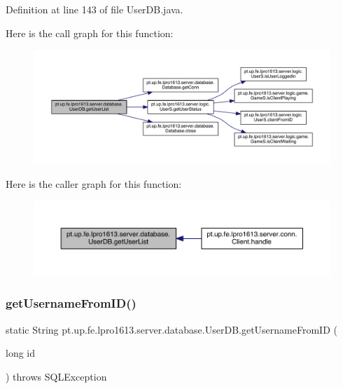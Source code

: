 Definition at line 143 of file User\+D\+B.\+java.

Here is the call graph for this function\+:
\nopagebreak
\begin{figure}[H]
\begin{center}
\leavevmode
\includegraphics[width=350pt]{classpt_1_1up_1_1fe_1_1lpro1613_1_1server_1_1database_1_1_user_d_b_a954a448685644afc277007bdf36bb507_cgraph}
\end{center}
\end{figure}
Here is the caller graph for this function\+:
\nopagebreak
\begin{figure}[H]
\begin{center}
\leavevmode
\includegraphics[width=350pt]{classpt_1_1up_1_1fe_1_1lpro1613_1_1server_1_1database_1_1_user_d_b_a954a448685644afc277007bdf36bb507_icgraph}
\end{center}
\end{figure}
\hypertarget{classpt_1_1up_1_1fe_1_1lpro1613_1_1server_1_1database_1_1_user_d_b_ab5c986eb5c2ba36eef3defee599c6903}{}\label{classpt_1_1up_1_1fe_1_1lpro1613_1_1server_1_1database_1_1_user_d_b_ab5c986eb5c2ba36eef3defee599c6903} 
\subsubsection{\texorpdfstring{get\+Username\+From\+I\+D()}{getUsernameFromID()}}
{\footnotesize\ttfamily static String pt.\+up.\+fe.\+lpro1613.\+server.\+database.\+User\+D\+B.\+get\+Username\+From\+ID (\begin{DoxyParamCaption}\item[{long}]{id }\end{DoxyParamCaption}) throws S\+Q\+L\+Exception\hspace{0.3cm}{\ttfamily [static]}}

